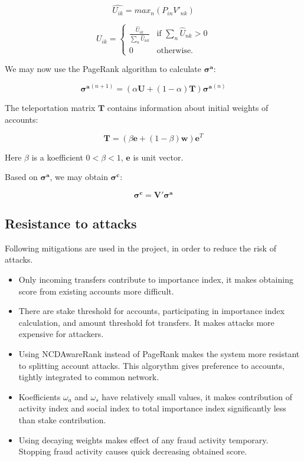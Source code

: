 \documentclass[a4paper,12pt]{article}
\begin{document}
$$
\hat{U_{ik}} = max_n(P_{in} V'_{nk})
$$

$$
U_{ik} = \begin{cases}
 \frac{\hat{U}_{ik}} {\sum_n{\hat{U}_{nk}}} & \text{if $\sum_n{\hat{U}_{nk}}>0$} \\
 0 & \text{otherwise.}
\end{cases}
$$

We may now use the PageRank algorithm to calculate $\boldsymbol{\sigma^a}$:

$$
\boldsymbol{\sigma^a}^{(n+1)} = (\alpha \boldsymbol{U} + (1 - \alpha) \boldsymbol{T})\boldsymbol{\sigma^a}^{(n)}
$$

The teleportation matrix $\boldsymbol{T}$ contains information about initial weights of accounts:

$$
\boldsymbol{T} = (\beta \boldsymbol{e} + (1 - \beta) \boldsymbol{w}) \boldsymbol{e}^T
$$

Here $\beta$ is a koefficient $0 < \beta < 1$, $\boldsymbol{e}$ is unit vector.

Based on $\boldsymbol{\sigma^a}$, we may obtain $\boldsymbol{\sigma^c}$:

$$
\boldsymbol{\sigma^c} = \boldsymbol{V'}\boldsymbol{\sigma^a}
$$

\subsection{Resistance to attacks}

Following mitigations are used in the project, in order to reduce the risk of attacks.

\begin{itemize}
  \item Only incoming transfers contribute to importance index, it makes obtaining score from existing accounts more difficult.
  \item There are stake threshold for accounts, participating in importance index calculation, and amount threshold fot transfers. It makes attacks more expensive for attackers.
  \item Using NCDAwareRank instead of PageRank makes the system more resistant to splitting account attacks. This algorythm gives preference to accounts, tightly integrated to common network.
  \item Koefficients $\omega_a$ and $\omega_s$ have relatively small values, it makes contribution of activity index and social index to total importance index significantly less than stake contribution.
  \item Using decaying weights makes effect of any fraud activity temporary. Stopping fraud activity causes quick decreasing obtained score.
\end{itemize}
\end{document}
